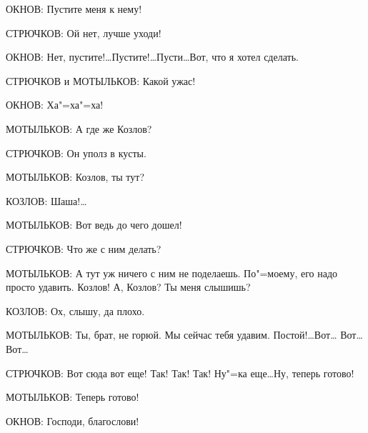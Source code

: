 ОКНОВ: Пустите меня к нему!

СТРЮЧКОВ: Ой нет, лучше уходи!

ОКНОВ: Нет, пустите!\dots Пустите!\dots Пусти\dots Вот, что я хотел сделать.

СТРЮЧКОВ и МОТЫЛЬКОВ: Какой ужас!

ОКНОВ: Ха"=ха"=ха!

МОТЫЛЬКОВ: А где же Козлов?

СТРЮЧКОВ: Он уполз в кусты.

МОТЫЛЬКОВ: Козлов, ты тут?

КОЗЛОВ: Шаша!\dots

МОТЫЛЬКОВ: Вот ведь до чего дошел!

СТРЮЧКОВ: Что же с ним делать?

МОТЫЛЬКОВ: А тут уж ничего с ним не поделаешь. По"=моему, его надо просто
удавить. Козлов! А, Козлов? Ты меня слышишь?

КОЗЛОВ: Ох, слышу, да плохо.

МОТЫЛЬКОВ: Ты, брат, не горюй. Мы сейчас тебя удавим. Постой!\dots Вот\dots
Вот\dots Вот\dots

СТРЮЧКОВ: Вот сюда вот еще! Так! Так! Так! Ну"=ка еще\dots Ну, теперь готово!

МОТЫЛЬКОВ: Теперь готово!

ОКНОВ: Господи, благослови!